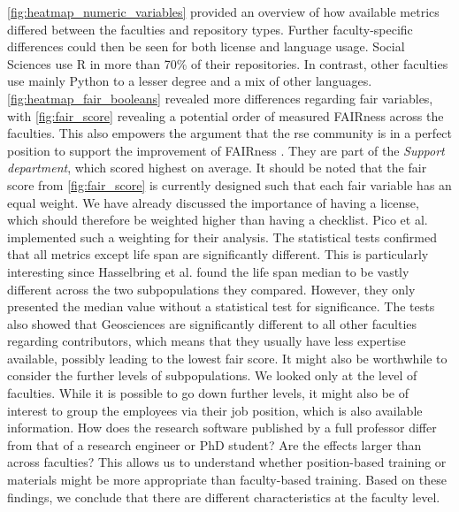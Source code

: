 \autoref{fig:heatmap_numeric_variables} provided an overview of how available metrics differed between the faculties and repository types. Further faculty-specific differences could then be seen for both license and language usage. Social Sciences use R in more than 70\% of their repositories. In contrast, other faculties use mainly Python to a lesser degree and a mix of other languages. \autoref{fig:heatmap_fair_booleans} revealed more differences regarding \acrshort{fair} variables, with \autoref{fig:fair_score} revealing a potential order of measured FAIRness across the faculties. This also empowers the argument that the \acrshort{rse} community is in a perfect position to support the improvement of FAIRness \cite{hasselbring_fair_2020}. They are part of the \textit{Support department}, which scored highest on average. 
It should be noted that the \acrshort{fair} score from \autoref{fig:fair_score} is currently designed such that each \acrshort{fair} variable has an equal weight. We have already discussed the importance of having a license, which should therefore be weighted higher than having a checklist. Pico et al. \cite{pico_fairsoft_2022} implemented such a weighting for their analysis.
The statistical tests confirmed that all metrics except life span are significantly different. This is particularly interesting since Hasselbring et al. \cite{hasselbring_open_2020} found the life span median to be vastly different across the two subpopulations they compared. However, they only presented the median value without a statistical test for significance. 
The tests also showed that Geosciences are significantly different to all other faculties regarding contributors, which means that they usually have less expertise available, possibly leading to the lowest \acrshort{fair} score.
It might also be worthwhile to consider the further levels of subpopulations. We looked only at the level of faculties. While it is possible to go down further levels, it might also be of interest to group the employees via their job position, which is also available information. How does the research software published by a full professor differ from that of a research engineer or PhD student? Are the effects larger than across faculties? This allows us to understand whether position-based training or materials might be more appropriate than faculty-based training. 
Based on these findings, we conclude that there are different characteristics at the faculty level. 

